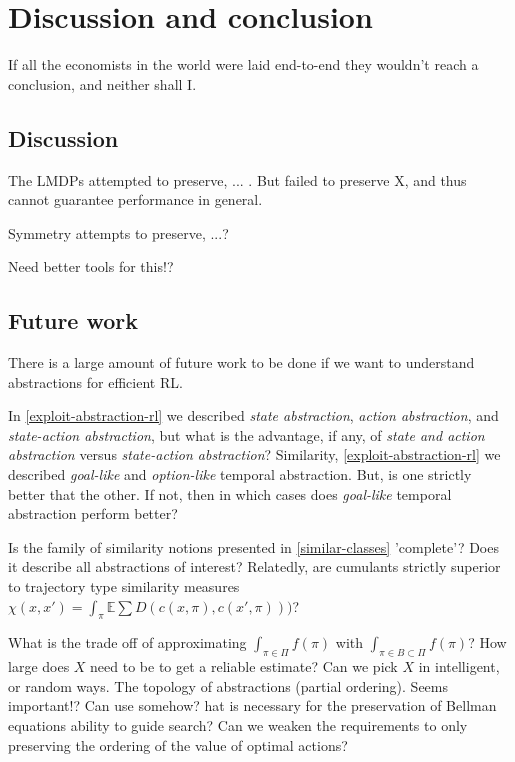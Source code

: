 \chapter{Discussion and conclusion}\label{C:con}

If all the economists in the world were laid end-to-end they wouldn't
reach a conclusion, and neither shall I.


\section{Discussion}

The LMDPs attempted to preserve, ... . But failed to preserve X, and thus cannot guarantee performance in general.

Symmetry attempts to preserve, ...?

Need better tools for this!?


\section{Future work}

There is a large amount of future work to be done if we want to understand abstractions for efficient RL.

In \ref{exploit-abstraction-rl} we described \textit{state abstraction}, \textit{action abstraction}, and \textit{state-action abstraction}, but what is the advantage, if any, of \textit{state and action abstraction} versus \textit{state-action abstraction}? Similarity, \ref{exploit-abstraction-rl} we described \textit{goal-like} and \textit{option-like} temporal abstraction. But, is one strictly better that the other. If not, then in which cases does \textit{goal-like} temporal abstraction perform better?

Is the family of similarity notions presented in \ref{similar-classes} 'complete'? Does it describe all abstractions of interest?
Relatedly, are cumulants strictly superior to trajectory type similarity measures $\chi(x, x') = \int_\pi \mathbb E \sum D(c(x, \pi), c(x', \pi)))$?

What is the trade off of approximating $\int_{\pi \in \Pi}f(\pi)$ with $\int_{\pi \in B \subset \Pi}f(\pi)$?
How large does $X$ need to be to get a reliable estimate? Can we pick $X$ in intelligent, or random ways.
The topology of abstractions (partial ordering). Seems important!? Can use somehow?
hat is necessary for the preservation of Bellman equations ability to guide search? Can we weaken the requirements to only preserving the ordering of the value of optimal actions?

